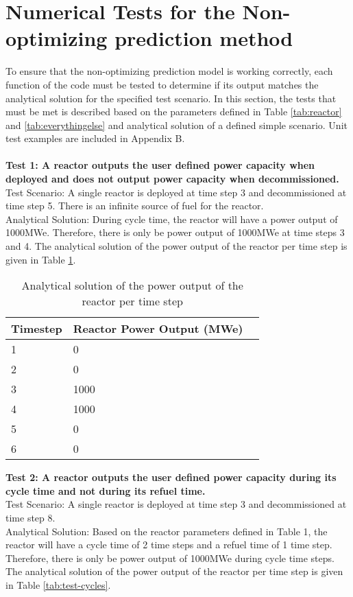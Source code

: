 \documentclass[12pt,letterpaper]{article}
\begin{document}
\section{Numerical Tests for the Non-optimizing prediction method}
To ensure that the non-optimizing prediction model is working correctly, each function of the code must be tested to determine if its output matches the analytical solution for the specified test scenario. In this section, the tests that must be met is described based on the parameters defined in Table \ref{tab:reactor} and \ref{tab:everythingelse} and analytical solution of a defined simple scenario. Unit test examples are included in Appendix B.
\\
\\
\noindent
\textbf{Test 1: A reactor outputs the user defined power capacity when deployed and does not output
power capacity when decommissioned.} \\
Test Scenario: A single reactor is deployed at time step 3 and decommissioned at time step 5. There is an infinite source of fuel for the reactor. \\
Analytical Solution: During cycle time, the reactor will have a power output of 1000MWe. Therefore,
there is only be power output of 1000MWe at time steps 3 and 4. The analytical solution of
the power output of the reactor per time step is given in Table \ref{tab:test-power}.

\begin{table}[H]
     \centering
    \begin{tabularx}{\textwidth}{bbb}
       \hline
       Timestep & Reactor Power Output (MWe) \\
       \hline
       1 & 0 \\
       2 & 0 \\
       3 & 1000 \\
       4 & 1000 \\
       5 & 0 \\
       6 & 0 \\
       \hline
    \end{tabularx}
    \caption {Analytical solution of the power output of the reactor per time step}
    \label{tab:test-power}
\end{table}

\noindent
\textbf{Test 2: A reactor outputs the user defined power capacity during its cycle time and not during its refuel time.} \\
Test Scenario: A single reactor is deployed at time step 3 and decommissioned at time step 8. \\
Analytical Solution: Based on the reactor parameters defined in Table 1, the reactor will have a cycle time of 2 time steps and a refuel time of 1 time step. Therefore, there is only be power output of 1000MWe during cycle time steps. The analytical solution of the power output of the reactor per time step is given in Table \ref{tab:test-cycles}.
\end{document}
